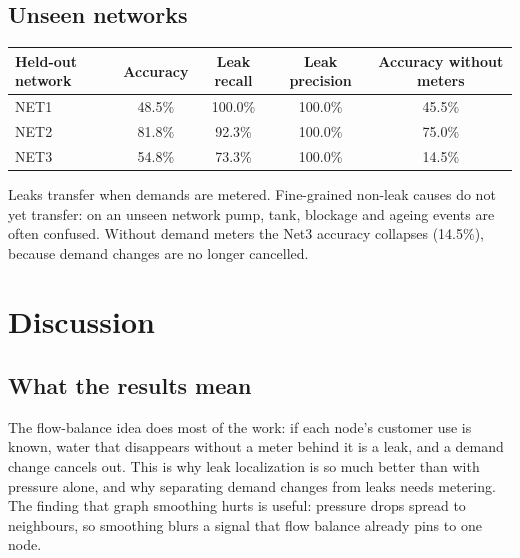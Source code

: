 \documentclass[11pt,a4paper]{article}
\begin{document}
\subsection{Unseen networks}
\begin{center}\small\begin{tabular}{@{}lcccc@{}}\toprule
Held-out network & Accuracy & Leak recall & Leak precision & Accuracy without meters \\\midrule
NET1 & 48.5\% & 100.0\% & 100.0\% & 45.5\% \\
NET2 & 81.8\% & 92.3\% & 100.0\% & 75.0\% \\
NET3 & 54.8\% & 73.3\% & 100.0\% & 14.5\% \\
\bottomrule\end{tabular}\end{center}
Leaks transfer when demands are metered. Fine-grained non-leak causes do not yet transfer: on an unseen network pump, tank, blockage and ageing events are often confused. Without demand meters the Net3 accuracy collapses (14.5\%), because demand changes are no longer cancelled.

\section{Discussion}\label{sec:limits}
\subsection{What the results mean}
The flow-balance idea does most of the work: if each node's customer use is known, water that disappears without a meter behind it is a leak, and a demand change cancels out. This is why leak localization is so much better than with pressure alone, and why separating demand changes from leaks needs metering. The finding that graph smoothing hurts is useful: pressure drops spread to neighbours, so smoothing blurs a signal that flow balance already pins to one node.
\end{document}
